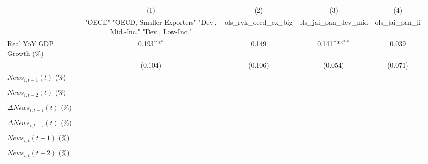{
\def\sym#1{\ifmmode^{#1}\else\(^{#1}\)\fi}
\begin{tabular}{l*{4}{c}}
\toprule
                    &\multicolumn{1}{c}{(1)}&\multicolumn{1}{c}{(2)}&\multicolumn{1}{c}{(3)}&\multicolumn{1}{c}{(4)}\\
                    &\multicolumn{1}{c}{ "OECD" "OECD, Smaller Exporters" "Dev., Mid.-Inc." "Dev., Low-Inc."}&\multicolumn{1}{c}{ols_rvk_oecd_ex_big}&\multicolumn{1}{c}{ols_jai_pan_dev_mid}&\multicolumn{1}{c}{ols_jai_pan_li}\\
\midrule
Real YoY GDP Growth (\%)&       0.193\sym{*}  &       0.149         &       0.141\sym{**} &       0.039         \\
                    &     (0.104)         &     (0.106)         &     (0.054)         &     (0.071)         \\
\addlinespace
$ News_{i,t-1}(t)$ (\%)&                     &                     &                     &                     \\
                    &                     &                     &                     &                     \\
\addlinespace
$ News_{i,t-2}(t)$ (\%)&                     &                     &                     &                     \\
                    &                     &                     &                     &                     \\
\addlinespace
$ \Delta News_{i,t-1}(t)$ (\%)&                     &                     &                     &                     \\
                    &                     &                     &                     &                     \\
\addlinespace
$ \Delta News_{i,t-2}(t)$ (\%)&                     &                     &                     &                     \\
                    &                     &                     &                     &                     \\
\addlinespace
$ News_{i,t}(t+1)$ (\%)&                     &                     &                     &                     \\
                    &                     &                     &                     &                     \\
\addlinespace
$ News_{i,t}(t+2)$ (\%)&                     &                     &                     &                     \\

\end{tabular}}
